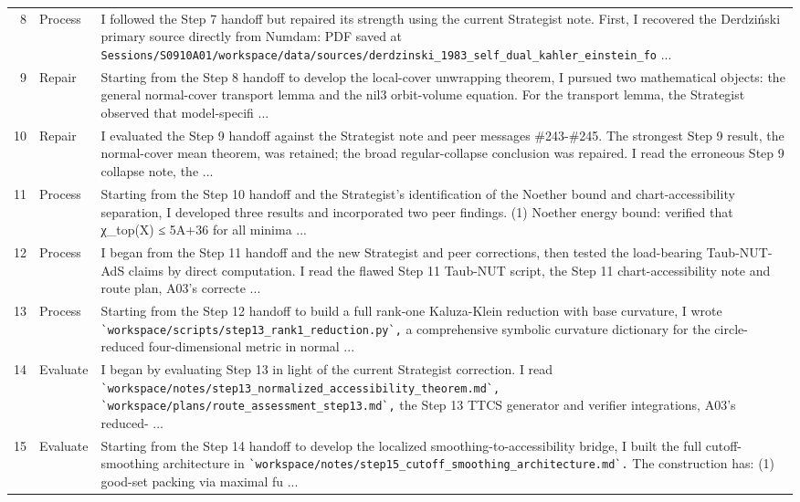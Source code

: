 \documentclass[UTF8,fontset=fandol,zihao=-4]{ctexart}
\begin{document}
\begin{longtable}{r p{} >{\raggedright\arraybackslash}p{}}
8 & Process & I followed the Step 7 handoff but repaired its strength using the current Strategist note. First, I recovered the Derdziński primary source directly from Numdam: PDF saved at \nolinkurl{Sessions/S0910A01/workspace/data/sources/derdzinski_1983_self_dual_kahler_einstein_fo} ...\\
9 & Repair & Starting from the Step 8 handoff to develop the local-cover unwrapping theorem, I pursued two mathematical objects: the general normal-cover transport lemma and the nil3 orbit-volume equation. For the transport lemma, the Strategist observed that model-specifi ...\\
10 & Repair & I evaluated the Step 9 handoff against the Strategist note and peer messages \#243-\#245. The strongest Step 9 result, the normal-cover mean theorem, was retained; the broad regular-collapse conclusion was repaired. I read the erroneous Step 9 collapse note, the ...\\
11 & Process & Starting from the Step 10 handoff and the Strategist's identification of the Noether bound and chart-accessibility separation, I developed three results and incorporated two peer findings. (1) Noether energy bound: verified that χ\_top(X) ≤ 5A+36 for all minima ...\\
12 & Process & I began from the Step 11 handoff and the new Strategist and peer corrections, then tested the load-bearing Taub-NUT-AdS claims by direct computation. I read the flawed Step 11 Taub-NUT script, the Step 11 chart-accessibility note and route plan, A03's correcte ...\\
13 & Process & Starting from the Step 12 handoff to build a full rank-one Kaluza-Klein reduction with base curvature, I wrote \nolinkurl{`workspace/scripts/step13_rank1_reduction.py`,} a comprehensive symbolic curvature dictionary for the circle-reduced four-dimensional metric in normal ...\\
14 & Evaluate & I began by evaluating Step 13 in light of the current Strategist correction. I read \nolinkurl{`workspace/notes/step13_normalized_accessibility_theorem.md`,} \nolinkurl{`workspace/plans/route_assessment_step13.md`,} the Step 13 TTCS generator and verifier integrations, A03's reduced- ...\\
15 & Evaluate & Starting from the Step 14 handoff to develop the localized smoothing-to-accessibility bridge, I built the full cutoff-smoothing architecture in \nolinkurl{`workspace/notes/step15_cutoff_smoothing_architecture.md`.} The construction has: (1) good-set packing via maximal fu ...\\

\end{longtable}
\end{document}
